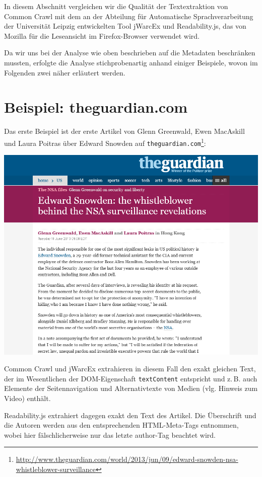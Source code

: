 \documentclass[a4paper,12pt,titlepage=false]{scrreprt}
\begin{document}
In diesem Abschnitt vergleichen wir die Qualität der Textextraktion von Common Crawl mit dem an der Abteilung für Automatische Sprachverarbeitung der Universität Leipzig entwickelten Tool jWarcEx und Readability.js, das von Mozilla für die Leseansicht im Firefox-Browser verwendet wird.

Da wir uns bei der Analyse wie oben beschrieben auf die Metadaten beschränken mussten, erfolgte die Analyse stichprobenartig anhand einiger Beispiele, wovon im Folgenden zwei näher erläutert werden.

\section{Beispiel: theguardian.com}

Das erste Beispiel ist der erste Artikel von Glenn Greenwald, Ewen MacAskill und Laura Poitras über Edward Snowden auf \texttt{theguardian.com}\footnote{\url{http://www.theguardian.com/world/2013/jun/09/edward-snowden-nsa-whistleblower-surveillance}}:

\begin{center}
    \includegraphics[trim=0 130px 0 0, clip=true, width=.8\textwidth]{images/guardian-website}
\end{center}

\noindent
Common Crawl und jWarcEx extrahieren in diesem Fall den exakt gleichen Text, der im Wesentlichen der DOM-Eigenschaft \texttt{textContent} entspricht und z.\,B. auch Elemente der Seitennavigation und Alternativtexte von Medien (vlg. Hinweis zum Video) enthält.

Readability.js extrahiert dagegen exakt den Text des Artikel. Die Überschrift und die Autoren werden aus den entsprechenden HTML-Meta-Tags entnommen, wobei hier fälschlicherweise nur das letzte author-Tag beachtet wird.
\end{document}
